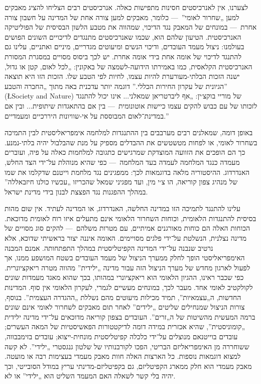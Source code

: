 לצערנו, אין לאנרכיסטים חסינות מתפישות כאלה. אנרכיסטים רבים הצליחו להציג מאבקים למען „שחרור לאומי”~— כלומר, מאבקים למען צורה אחת של המדינה על חשבון צורה אחרת~— במונחים של המאבק נגד הדיכוי, שמהווה את מטבע הלשון הבסיסית של הפוליטיקה האנרכיסטית. הטיעון שלהם הוא, שכמו שאנרכיסטים מתנגדים לדיכויים השונים הפושים בעולמנו: ניצול מעמד העובדים, ודיכוי הנשים ומיעוטים מגדריים, מיניים ואתניים, עלינו גם להתנגד לדיכוי של אומה אחת בידי אומה אחרת. יש לכך ביסוס מסויים במסגרת המסורת האנרכיסטית הקלאסית, כמו באמירתו הידועה-לשמצה של באקונין: „לכל לאום, קטן או גדול, ישנה הזכות הבלתי-מעורערת להיות עצמו, לחיות לפי הטבע שלו. הזכות הזו היא תוצאה הגיונית של עקרון החירות הכללי.” דוגמה יותר עדכנית באה מתוך „החברה והטבע” (\L{Society and Nature}) של מוריי בוקצ׳ין: „אף ליברטריאן שמאלני... אינו יכול להתנגד לזכותו של עם כבוש להקים עצמו כיישות אוטונומית~— בין אם בהתאגדות שיתופית... ובין אם במדינת־לאום המבוססת על אי-שוויונות היררכיים ומעמדיים.”

באופן דומה, שמאלנים רבים מערבבים בין ההתנגדות למלחמה אימפריאליסטית לבין התמיכה בשחרור לאומי, או לפחות מטשטשים את ההבדלים מספיק על מנת שהבלבול יהיה בלתי-נמנע. כך הם הופכים את הזוועה המוצדקת שמרגישים כתגובה למלחמות כאלה על פיה, ועוברים מעמדה כנגד המלחמה לעמדה בעד המלחמה~— כפי שהיא מנוהלת על־ידי הצד החלש, האנדרדוג. ההיסטוריה מלאה בדוגמאות לכך: ממפגינים נגד מלחמת וייטנם שדקלמו את שמו של מנהיג צפון קוריאה, הו צ׳י מין, ועד מפגיני שמאל שהכריזו „עכשיו כולנו חיזבאללה” במהלך ההפגנות נגד הפצצת לבנון בידי מדינת ישראל.

עלינו להתנגד לתמיכה הזו במדינה החלשה, האנדרדוג, או המדינה לעתיד. אין שום מהות בסיסית להתנגדות הלאומית, וכוחות השחרור הלאומי אינם מתעלים איזו רוח לאומית מדוכאת. הכוחות האלה הם כוחות מאורגנים אמיתיים, עם מטרות משלהם~— להקים סוג מסויים של מדינה נצלנית, הנשלטת על־ידי פלגים מסויימים. האומה איננה יצור בראשיתי שדוכא, אלא נרטיב שנבנה על־ידי המדינה הקפיטליסטית במהלך התפתחותה. אמנם המבנה האימפריאליסטי הופך לחלק ממערך הניצול של מעמד העובדים בשטח המושפע ממנו, אך לפעול לארגון מחדש של מערך הניצול הזה עבור מדינה „ילידית” מהווה מטרה ריאקציונרית. כפי שכבר ראינו, ההגיון הלאומי הוא ריאקציונרי במהותו, בכך שהוא מאגד מעמדות שונים לקולקטיב לאומי אחד. מעבר לכך, במונחים מעשיים לגמרי, לעקרון הלאומי אין סוף. המדינות החדשות, ה„עצמאיות”, תמיד מכילות מיעוטים מהם נשללת „ההגדרה העצמית”. בנוסף, צורות הניצול שמנחילים שליטים „ילידים” לאחר תום מאבקים לשחרור לאומי אינם שונים ברמה המעשית מהשיטות של ה„זרים”. העובדים בצפון קוריאה מדוכאים על־ידי מדינה ילידית „קומוניסטית”, שהיא אכזרית במידה דומה לדיקטטורות הפאשיסטיות של המאה העשרים; עובדים בוייטנאם מנוצלים על־ידי כלכלה קפיטליסטית מונחית-ייצוא; עובדים בזימבבווה, ששוחררה מן האימפריאליזם הבריטי, הפכו לקורבנותיו של שלטון גנגסטרי „ילידי”. לא קשה למצוא דוגמאות נוספות. כל הארצות האלה חוות מאבק מעמדי בעצימות רבה או מועטה. מאבק מעמדי הוא חלק ממארג הקפיטליזם, גם בקפיטליזם-מדינתי עריץ במודל הסובייטי, וכך יהיה בלי קשר לשאלה האם המעמד השליט הוא „ילידי” או לא.

